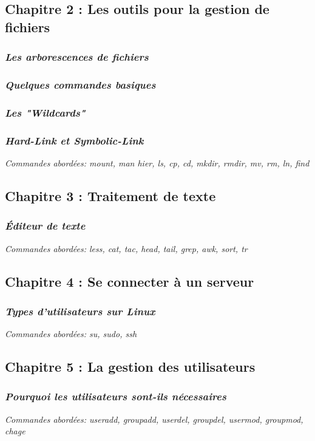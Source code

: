 \documentclass[12pt, a4paper]{article}
\begin{document}
\subsection{\Large Chapitre 2 : Les outils pour la gestion de fichiers}
\subsubsection{\textit{Les arborescences de fichiers}}
\subsubsection{\textit{Quelques commandes basiques}}
\subsubsection{\textit{Les "Wildcards"}}
\subsubsection{\textit{Hard-Link et Symbolic-Link}}
\textit{Commandes abordées: \color{red}mount, man hier, ls, cp, cd, mkdir, rmdir, mv, rm, ln, find\vspace{-0.65em}}
\subsection{\Large Chapitre 3 : Traitement de texte}
\subsubsection{\textit{Éditeur de texte}}
\textit{Commandes abordées: \color{red}less, cat, tac, head, tail, grep, awk, sort, tr\vspace{-0.65em}}
\subsection{\Large Chapitre 4 : Se connecter à un serveur}
\subsubsection{\textit{Types d'utilisateurs sur Linux}}
\textit{Commandes abordées: \color{red} su, sudo, ssh\vspace{-0.65em}}
\subsection{\Large Chapitre 5 : La gestion des utilisateurs}
\subsubsection{\textit{Pourquoi les utilisateurs sont-ils nécessaires}}
\textit{Commandes abordées: \color{red} useradd, groupadd, userdel, groupdel, usermod, groupmod, chage\vspace{-0.65em}}
\end{document}

